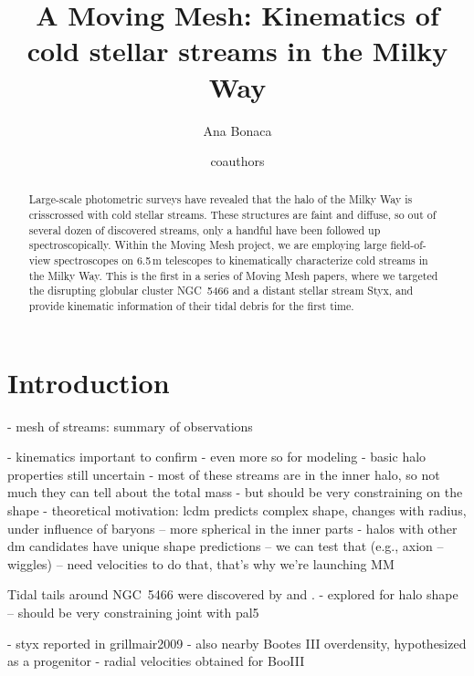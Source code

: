 \documentclass[modern]{aastex61}
\begin{document}
\sloppy\sloppypar\raggedbottom\frenchspacing

\title{A Moving Mesh: Kinematics of cold stellar streams in the Milky Way}


\author[0000-0002-7846-9787]{Ana Bonaca}

\author{coauthors}

\begin{abstract}
\noindent
Large-scale photometric surveys have revealed that the halo of the Milky Way is crisscrossed with cold stellar streams.
These structures are faint and diffuse, so out of several dozen of discovered streams, only a handful have been followed up spectroscopically.
Within the Moving Mesh project, we are employing large field-of-view spectroscopes on 6.5\,m telescopes to kinematically characterize cold streams in the Milky Way.
This is the first in a series of Moving Mesh papers, where we targeted the disrupting globular cluster NGC~5466 and a distant stellar stream Styx, and provide kinematic information of their tidal debris for the first time.
\end{abstract}



\section{Introduction}
\label{sec:intro}
- mesh of streams: summary of observations

- kinematics important to confirm
- even more so for modeling
- basic halo properties still uncertain
- most of these streams are in the inner halo, so not much they can tell about the total mass
- but should be very constraining on the shape
- theoretical motivation: lcdm predicts complex shape, changes with radius, under influence of baryons -- more spherical in the inner parts
- halos with other dm candidates have unique shape predictions -- we can test that (e.g., axion -- wiggles)
-- need velocities to do that, that's why we're launching MM

Tidal tails around NGC~5466 were discovered by \citet{belokurov2006} and \citet{gj2006}.
- explored for halo shape -- should be very constraining joint with pal5

- styx reported in grillmair2009
- also nearby Bootes III overdensity, hypothesized as a progenitor
- radial velocities obtained for BooIII
\end{document}
